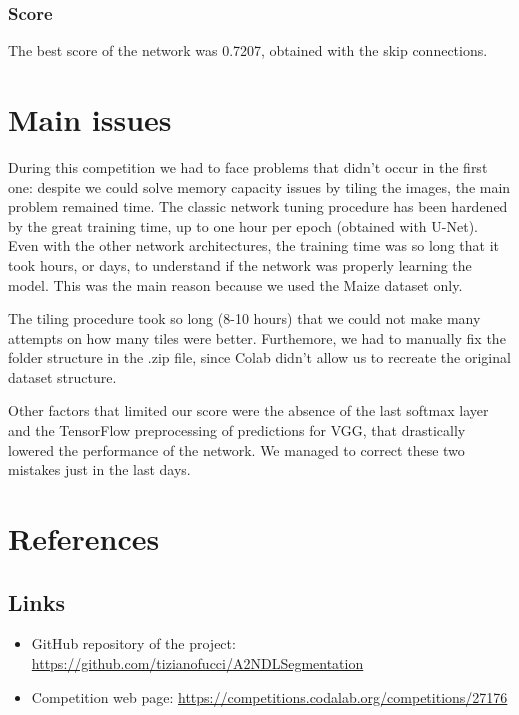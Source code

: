 \documentclass[12pt,a4paper]{report}
\begin{document}
\subsection{Score}
	The best score of the network was 0.7207, obtained with the skip connections.
		

\chapter{Main issues}
During this competition we had to face problems that didn't occur in the first one: despite we could solve memory capacity issues by tiling the images, the main problem remained time. The classic network tuning procedure has been hardened by the great training time, up to one hour per epoch (obtained with U-Net). Even with the other network architectures, the training time was so long that it took hours, or days, to understand if the network was properly learning the model. This was the main reason because we used the Maize dataset only.

The tiling procedure took so long (8-10 hours) that we could not make many attempts on how many tiles were better. Furthemore, we had to manually fix the folder structure in the .zip file, since Colab didn't allow us to recreate the original dataset structure.

Other factors that limited our score were the absence of the last softmax layer and the TensorFlow preprocessing of predictions for VGG, that drastically lowered the performance of the network. We managed to correct these two mistakes just in the last days.
	\chapter{References}
		\section{Links}

\begin{itemize}
	\item GitHub repository of the project: \url{https://github.com/tizianofucci/A2NDLSegmentation}
	\item Competition web page: \url{https://competitions.codalab.org/competitions/27176}
\end{itemize}
\end{document}

